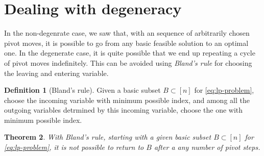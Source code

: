 \documentclass{amsbook}
\newtheorem{theorem}{Theorem}[section]
\theoremstyle{definition}
\newtheorem{definition}[theorem]{Definition}
\theoremstyle{remark}
\begin{document}
\section{Dealing with degeneracy}
\label{sec:deal-with-degen}
In the non-degenrate case, we saw that, with an sequence of arbitrarily chosen pivot moves, it is possible to go from any basic feasible solution to an  optimal one.
In the degenerate case, it is quite possible that we end up repeating a cycle of pivot moves indefinitely.
This can be avoided using \emph{Bland's rule} for choosing the leaving and entering variable.
\begin{definition}
  [Bland's rule]
  Given a basic subset $B\subset [n]$ for \eqref{eq:lp-problem}, choose the incoming variable with minimum possible index, and among all the outgoing variables detrmined by this incoming variable, choose the one with minimum possible index.
\end{definition}
\begin{theorem}
  With Bland's rule, starting with a given basic subset $B\subset [n]$ for \eqref{eq:lp-problem}, it is not possible to return to $B$ after a any number of pivot steps.
\end{theorem}
\end{document}

